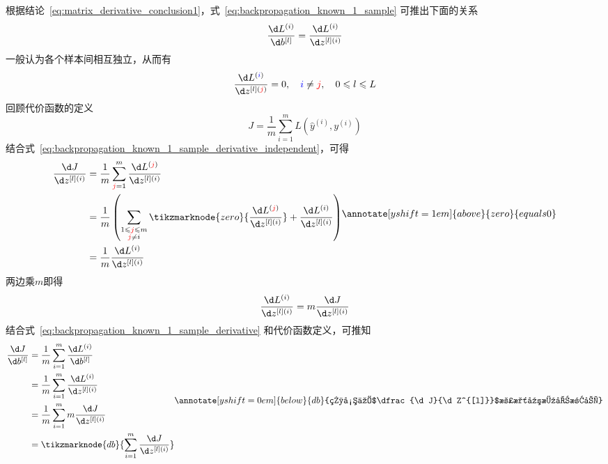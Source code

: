 根据结论~\eqref{eq:matrix_derivative_conclusion1}，式~\eqref{eq:backpropagation_known_1_sample} 可推出下面的关系
\begin{equation}
    \frac{\d L^{(i)}}{\d b^{[l]}} = \frac{\d L^{(i)}}{\d z^{[l](i)}}
    \label{eq:backpropagation_known_1_sample_derivative}
\end{equation}
一般认为各个样本间相互独立，从而有
\begin{equation}
    \frac{\d L^{(\textcolor{blue}{i})}}{\d z^{[l](\textcolor{red}{j})}}=0
    , \quad \textcolor{blue}{i} \neq \textcolor{red}{j}, \quad 0 \leqslant l \leqslant L
    \label{eq:backpropagation_known_1_sample_derivative_independent}
\end{equation}
回顾代价函数的定义
\begin{equation}
    J = \frac{1}{m} \sum_{i=1}^{m} L(\hat{y}^{(i)}, y^{(i)})
\end{equation}
结合式~\eqref{eq:backpropagation_known_1_sample_derivative_independent}，可得
\begin{equation}
    \begin{aligned}
        \frac{\d J}{\d z^{[l](i)}} 
        &= \frac{1}{m}  \sum_{\textcolor{red}{j}=1}^{m} \frac{\d L^{(\textcolor{red}{j})}}{\d z^{[l](i)}} \\
        &= \frac{1}{m}  \left( \sum_{\substack{1 \leqslant \textcolor{red}{j} \leqslant m \\ \textcolor{red}{j} \neq i}} \tikzmarknode{zero}{\frac{\d L^{(\textcolor{red}{j})}}{\d z^{[l](i)}}} + \frac{\d L^{(i)}}{\d z^{[l](i)}} \right) \\
        &= \frac{1}{m} \frac{\d L^{(i)}}{\d z^{[l](i)}} \\
    \end{aligned}
    \annotate[yshift=1em]{above}{zero}{equals 0}
\end{equation}
两边乘$m$即得
\begin{equation}
    \frac{\d L^{(i)}}{\d z^{[l](i)}} = m \frac{\d J}{\d z^{[l](i)}}
    \label{eq:backpropagation_m_derivative_conc}
\end{equation}
结合式~\eqref{eq:backpropagation_known_1_sample_derivative} 和代价函数定义，可推知
\begin{equation}
    \begin{aligned}
        \frac{\d J}{\d b^{[l]}} 
        &= \frac{1}{m} \sum_{i=1}^{m} \frac{\d L^{(i)}}{\d b^{[l]}} \\
        &= \frac{1}{m} \sum_{i=1}^{m} \frac{\d L^{(i)}}{\d z^{[l](i)}} \\
        &= \frac{1}{m} \sum_{i=1}^{m} m \frac{\d J}{\d z^{[l](i)}} \\
        &= \tikzmarknode{db}{\sum_{i=1}^{m} \frac{\d J}{\d z^{[l](i)}}}
    \label{eq:backpropagation_conc_4}
    \end{aligned}
    \vspace{2em}
    \renewcommand{\eqnannotationstrut}{\rule[-0.7\baselineskip]{0pt}{1.5\baselineskip}} %
    \annotate[yshift=0em]{below}{db}{相当于$\dfrac{\d J}{\d Z^{[l]}}$沿水平方向求和}
    \renewcommand{\eqnannotationstrut}{\strut} %
\end{equation}
